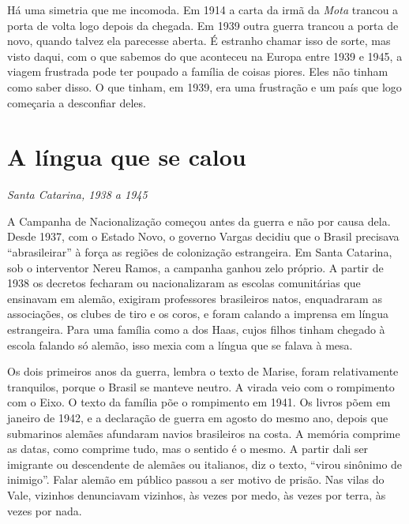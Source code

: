 \documentclass[
  brazilian,
  11pt,
  openany]{book}
\begin{document}
Há uma simetria que me incomoda. Em 1914 a carta da irmã da \emph{Mota}
trancou a porta de volta logo depois da chegada. Em 1939 outra guerra
trancou a porta de novo, quando talvez ela parecesse aberta. É estranho
chamar isso de sorte, mas visto daqui, com o que sabemos do que
aconteceu na Europa entre 1939 e 1945, a viagem frustrada pode ter
poupado a família de coisas piores. Eles não tinham como saber disso. O
que tinham, em 1939, era uma frustração e um país que logo começaria a
desconfiar deles.

\section{A língua que se calou}\label{a-luxedngua-que-se-calou}

\emph{Santa Catarina, 1938 a 1945}

A Campanha de Nacionalização começou antes da guerra e não por causa
dela. Desde 1937, com o Estado Novo, o governo Vargas decidiu que o
Brasil precisava ``abrasileirar'' à força as regiões de colonização
estrangeira. Em Santa Catarina, sob o interventor Nereu Ramos, a
campanha ganhou zelo próprio. A partir de 1938 os decretos fecharam ou
nacionalizaram as escolas comunitárias que ensinavam em alemão, exigiram
professores brasileiros natos, enquadraram as associações, os clubes de
tiro e os coros, e foram calando a imprensa em língua estrangeira. Para
uma família como a dos Haas, cujos filhos tinham chegado à escola
falando só alemão, isso mexia com a língua que se falava à mesa.

Os dois primeiros anos da guerra, lembra o texto de Marise, foram
relativamente tranquilos, porque o Brasil se manteve neutro. A virada
veio com o rompimento com o Eixo. O texto da família põe o rompimento em
1941. Os livros põem em janeiro de 1942, e a declaração de guerra em
agosto do mesmo ano, depois que submarinos alemães afundaram navios
brasileiros na costa. A memória comprime as datas, como comprime tudo,
mas o sentido é o mesmo. A partir dali ser imigrante ou descendente de
alemães ou italianos, diz o texto, ``virou sinônimo de inimigo''. Falar
alemão em público passou a ser motivo de prisão. Nas vilas do Vale,
vizinhos denunciavam vizinhos, às vezes por medo, às vezes por terra, às
vezes por nada.
\end{document}
